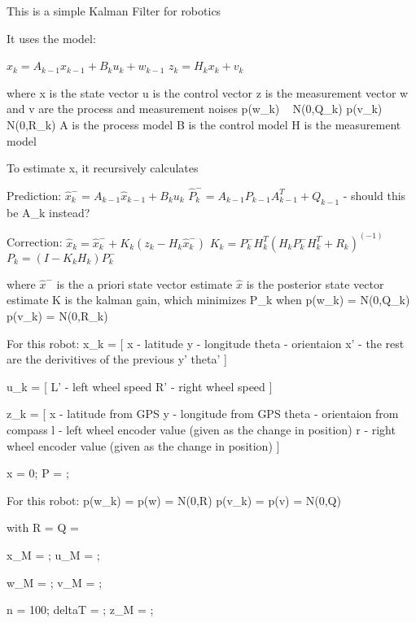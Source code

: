 This is a simple Kalman Filter for robotics


It uses the model:

  $x_k = A_{k-1} x_{k-1} + B_k u_k + w_{k-1}$
  $z_k = H_k x_k + v_k$

where
  x is the state vector
  u is the control vector
  z is the measurement vector
  w and v are the process and measurement noises
    p(w_k) ~ N(0,Q_k)
    p(v_k) ~ N(0,R_k)
  A is the process model
  B is the control model
  H is the measurement model

To estimate x, it recursively calculates

Prediction:
  $\hat{x}^-_k = A_{k-1} \hat{x}_{k-1} + B_k u_k$
  $\hat{P}^-_k = A_{k-1} P_{k-1} A^T_{k-1}  +  Q_{k-1}$ 
    - should this be A_k instead?

Correction:
  $\hat{x}_k  =  \hat{x}^-_k + K_k ( z_k - H_k \hat{x}^-_k )$
  $K_k = P^-_k H^T_k ( H_k P^-_k H^T_k + R_k )^(-1)$
  $P_k = ( I - K_k H_k ) P^-_k$

where
  $\hat{x}^-$ is the a priori state vector estimate
  $\hat{x}$ is the posterior state vector estimate
  K is the kalman gain, which minimizes P_k when
    p(w_k) = N(0,Q_k)
    p(v_k) = N(0,R_k)


For this robot:
x_k = [
        x     - latitude
        y     - longitude
        theta - orientaion
        x'    - the rest are the derivitives of the previous
        y'
        theta'
      ]

u_k = [
        L' - left wheel speed
        R' - right wheel speed
      ]

z_k = [
        x       - latitude from GPS 
        y       - longitude from GPS
        theta   - orientaion from compass
        l       - left wheel encoder value (given as the change in position)
        r       - right wheel encoder value (given as the change in position)
      ]


x = 0;
P = ;

For this robot:
  p(w_k) = p(w) = N(0,R)
  p(v_k) = p(v) =  N(0,Q)

with
  R = 
  Q = 


x_M = ; %
u_M = ; %

w_M = ; %
v_M = ; %

n = 100; %
deltaT = ; %
z_M = ;

